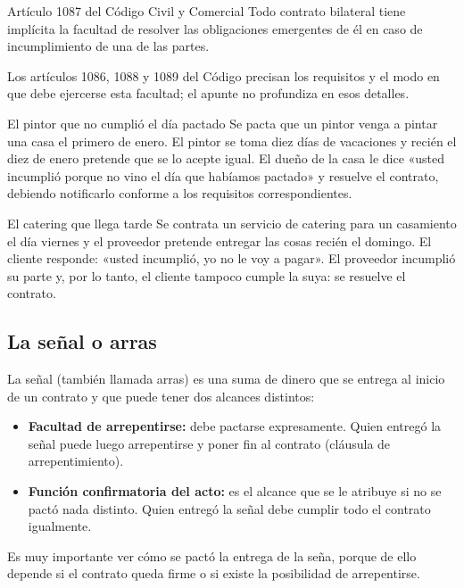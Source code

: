 \documentclass[12pt,oneside]{book}
\begin{document}
\begin{articulo}{Artículo 1087 del Código Civil y Comercial}
Todo contrato bilateral tiene implícita la facultad de resolver las obligaciones emergentes de él en caso de incumplimiento de una de las partes.
\end{articulo}

Los artículos 1086, 1088 y 1089 del Código precisan los requisitos y el modo en que debe ejercerse esta facultad; el apunte no profundiza en esos detalles.

\begin{example}{El pintor que no cumplió el día pactado}
Se pacta que un pintor venga a pintar una casa el primero de enero. El pintor se toma diez días de vacaciones y recién el diez de enero pretende que se lo acepte igual. El dueño de la casa le dice «usted incumplió porque no vino el día que habíamos pactado» y resuelve el contrato, debiendo notificarlo conforme a los requisitos correspondientes.
\end{example}

\begin{example}{El catering que llega tarde}
Se contrata un servicio de catering para un casamiento el día viernes y el proveedor pretende entregar las cosas recién el domingo. El cliente responde: «usted incumplió, yo no le voy a pagar». El proveedor incumplió su parte y, por lo tanto, el cliente tampoco cumple la suya: se resuelve el contrato.
\end{example}

\subsection{La señal o arras}

La señal (también llamada arras) es una suma de dinero que se entrega al inicio de un contrato y que puede tener dos alcances distintos:

\begin{itemize}
    \item \textbf{Facultad de arrepentirse:} debe pactarse expresamente. Quien entregó la señal puede luego arrepentirse y poner fin al contrato (cláusula de arrepentimiento).
    \item \textbf{Función confirmatoria del acto:} es el alcance que se le atribuye si no se pactó nada distinto. Quien entregó la señal debe cumplir todo el contrato igualmente.
\end{itemize}

\begin{important}
Es muy importante ver cómo se pactó la entrega de la seña, porque de ello depende si el contrato queda firme o si existe la posibilidad de arrepentirse.
\end{important}
\end{document}
